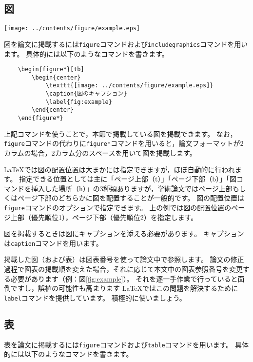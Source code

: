 \subsection{図}

\begin{figure*}[tb]
\begin{center}
\texttt{[image: ../contents/figure/example.eps]}
\caption{図のキャプション}
\label{fig:example}
\end{center}
\end{figure*}

図を論文に掲載するには{\tt figure}コマンドおよび{\tt includegraphics}コマンドを用います。
具体的には以下のようなコマンドを書きます。

\begin{verbatim}
    \begin{figure*}[tb]
        \begin{center}
            \texttt{[image: ../contents/figure/example.eps]}
            \caption{図のキャプション}
            \label{fig:example}
        \end{center}
    \end{figure*}
\end{verbatim}
上記コマンドを使うことで，本節で掲載している図を掲載できます。
なお，{\tt figure}コマンドの代わりに{\tt figure*}コマンドを用いると，論文フォーマットが2カラムの場合，2カラム分のスペースを用いて図を掲載します。

LaTeXでは図の配置位置は大まかには指定できますが，ほぼ自動的に行われます。
指定できる位置としては主に「ページ上部（t）」「ページ下部（b）」「図コマンドを挿入した場所（h）」の3種類ありますが，学術論文ではページ上部もしくはページ下部のどちらかに図を配置することが一般的です。
図の配置位置は{\tt figure}コマンドのオプションで指定できます。
上の例では図の配置位置のページ上部（優先順位1），ページ下部（優先順位2）を指定します。

図を掲載するときは図にキャプションを添える必要があります。
キャプションは{\tt caption}コマンドを用います。

掲載した図（および表）は図表番号を使って論文中で参照します。
論文の修正過程で図表の掲載順を変えた場合，それに応じて本文中の図表参照番号を変更する必要があります（例：図\ref{fig:example}）。
それを逐一手作業で行っていると面倒ですし，誤植の可能性も高まります
LaTeXではこの問題を解決するために{\tt label}コマンドを提供しています。
積極的に使いましょう。


\subsection{表}
表を論文に掲載するには{\tt figure}コマンドおよび{\tt table}コマンドを用います。
具体的には以下のようなコマンドを書きます。

